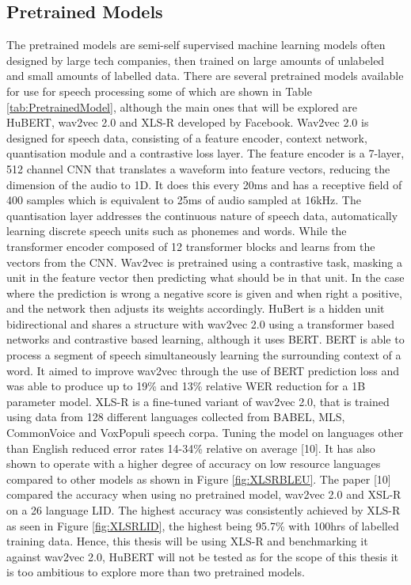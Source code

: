 \subsection{Pretrained Models}\label{sec:pretrain}
The pretrained models are semi-self supervised machine learning models often designed by large tech companies, then trained on large amounts of 
unlabeled and small amounts of labelled data. There are several pretrained models available for use for speech processing some of which are shown in Table \ref{tab:PretrainedModel},
although the main ones that will be explored are HuBERT, wav2vec 2.0 and XLS-R developed by Facebook. 
Wav2vec 2.0 is designed for speech data, consisting of a feature encoder, context network, quantisation module and 
a contrastive loss layer. The feature encoder is a 7-layer, 512 channel CNN that translates a waveform into feature vectors, reducing the dimension of the audio 
to 1D. It does this every 20ms and has a receptive field of 400 samples which is equivalent to 25ms of audio sampled at 16kHz. The quantisation layer 
addresses the continuous nature of speech data, automatically learning discrete speech units such as phonemes and words. While the transformer encoder composed of 12 
transformer blocks and learns from the vectors from the CNN. Wav2vec is pretrained using a contrastive task, masking a unit in the feature vector then predicting what 
should be in that unit. In the case where the prediction is wrong a negative score is given and when right a positive, and the network then adjusts its weights accordingly.  
HuBert is a hidden unit bidirectional and shares a structure with wav2vec 2.0 using a transformer based networks and contrastive based learning, although it uses BERT. 
BERT is able to process a segment of speech simultaneously learning the surrounding context of a word. It aimed to improve wav2vec through the use of BERT prediction loss and 
was able to produce up to 19\% and 13\% relative WER reduction for a 1B parameter model. XLS-R is a fine-tuned variant of wav2vec 2.0, that is trained using data from 128 different languages collected from  BABEL, MLS, CommonVoice and VoxPopuli speech corpa. 
Tuning the model on languages other than English reduced error rates 14-34\% relative on average [10]. It has also shown to operate 
with a higher degree of accuracy on low resource languages compared to other models as shown in Figure \ref{fig:XLSRBLEU}. 
The paper [10] compared the accuracy when using no pretrained model, wav2vec 2.0 and XSL-R on a 26 language LID. The highest accuracy was consistently achieved by XLS-R as seen in 
Figure \ref{fig:XLSRLID}, the highest being 95.7\% with 100hrs of labelled training data. 
Hence, this thesis will be using XLS-R and benchmarking it against wav2vec 2.0, HuBERT will not be tested as 
for the scope of this thesis it is too ambitious to explore more than two pretrained models. 

